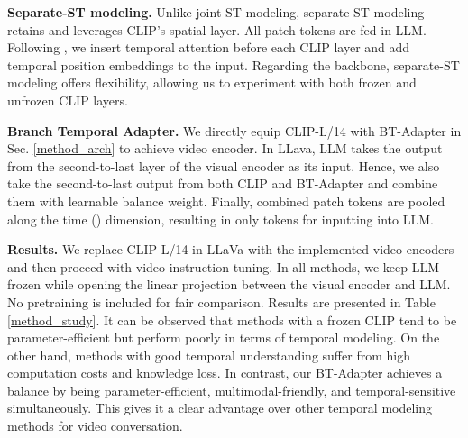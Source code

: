 \documentclass{article} \usepackage{iclr2024_conference,times}
\begin{document}
\noindent \textbf{Separate-ST modeling.}
Unlike joint-ST modeling, separate-ST modeling retains and leverages CLIP's spatial layer. All  patch tokens are fed in LLM. Following \citet{zeng2023tvtsv2}, we insert temporal attention before each CLIP layer and add temporal position embeddings to the input. Regarding the backbone, separate-ST modeling offers flexibility, allowing us to experiment with both frozen and unfrozen CLIP layers.

\noindent \textbf{Branch Temporal Adapter.}
We directly equip CLIP-L/14 with BT-Adapter in Sec. \ref{method_arch} to achieve video encoder. In LLava, LLM takes the output from the second-to-last layer of the visual encoder as its input. Hence, we also take the second-to-last output from both CLIP and BT-Adapter and combine them with learnable balance weight. Finally, combined patch tokens  are pooled along the time () dimension, resulting in only  tokens for inputting into LLM. 

\noindent \textbf{Results.} We replace CLIP-L/14 in LLaVa with the implemented video encoders and then proceed with video instruction tuning. In all methods, we keep LLM frozen while opening the linear projection between the visual encoder and LLM. No pretraining is included for fair comparison.
Results are presented in Table \ref{method_study}. It can be observed that methods with a frozen CLIP tend to be parameter-efficient but perform poorly in terms of temporal modeling. On the other hand, methods with good temporal understanding suffer from high computation costs and knowledge loss. In contrast, our BT-Adapter achieves a balance by being parameter-efficient, multimodal-friendly, and temporal-sensitive simultaneously. This gives it a clear advantage over other temporal modeling methods for video conversation.
\end{document}
